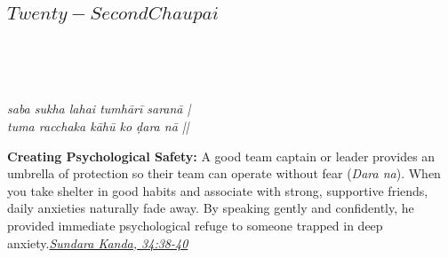 
\newpage

\subsection*{ \(Twenty-Second Chaupai\)}

\begin{minipage}[t]{0.55\textwidth}
\vspace{0pt}

{\large \linespread{1.5}\selectfont
{}\\
\par}

\vspace{0.5em}

{\large \linespread{1.5}\selectfont
{}\\
\par}

\vspace{0.5em}

{\large \linespread{1.3}\selectfont
\textit{saba sukha lahai tumhārī saranā |}\\
\textit{tuma racchaka kāhū ko ḍara nā ||}
\par}
\end{minipage}%
\hfill
\begin{minipage}[t]{0.42\textwidth}
\vspace{0pt}
\begin{tcolorbox}[anchorbox]
\textbf{Creating Psychological Safety:} A good team captain or leader provides an umbrella of protection so their team can operate without fear (\textit{Dara na}). When you take shelter in good habits and associate with strong, supportive friends, daily anxieties naturally fade away.
\vspace{0.5em}\newline By speaking gently and confidently, he provided immediate psychological refuge to someone trapped in deep anxiety.\newline\null\hfill\href{https://www.valmiki.iitk.ac.in/sloka?field_kanda_tid=5&language=dv&field_sarga_value=34}{\textit{Sundara Kanda, 34:38-40}}
\end{tcolorbox}
\end{minipage}


